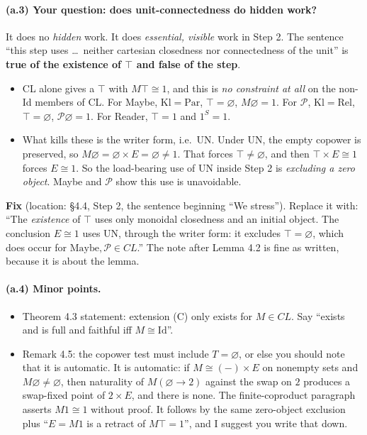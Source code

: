 \documentclass[11pt]{article}
\newcommand{\Kl}{\mathrm{Kl}}
\begin{document}
\paragraph{(a.3) Your question: does unit-connectedness do hidden work?} It does no \emph{hidden} work. It
does \emph{essential, visible} work in Step 2. The sentence ``this step uses \dots\ neither cartesian
closedness nor connectedness of the unit'' is \textbf{true of the existence of $\top$ and false of the step}.
\begin{itemize}
\item CL alone gives a $\top$ with $M\top\cong1$, and this is \emph{no constraint at all} on the non-Id members of
  CL. For Maybe, $\Kl=\mathrm{Par}$, $\top=\varnothing$, $M\varnothing=1$. For $\mathcal P$, $\Kl=\mathrm{Rel}$,
  $\top=\varnothing$, $\mathcal P\varnothing=1$. For Reader, $\top=1$ and $1^S=1$.
\item What kills these is the writer form, i.e.\ UN. Under UN, the empty copower is preserved, so
  $M\varnothing=\varnothing\times E=\varnothing\ne1$. That forces $\top\ne\varnothing$, and then $\top\times E\cong1$ forces
  $E\cong1$. So the load-bearing use of UN inside Step 2 is \emph{excluding a zero object}. Maybe and $\mathcal P$
  show this use is unavoidable.
\end{itemize}
\textbf{Fix} (location: \S4.4, Step 2, the sentence beginning ``We stress''). Replace it with: ``The
\emph{existence} of $\top$ uses only monoidal closedness and an initial object. The conclusion $E\cong1$ uses UN,
through the writer form: it excludes $\top=\varnothing$, which does occur for $\mathrm{Maybe},\mathcal P\in CL$.''
The note after Lemma 4.2 is fine as written, because it is about the lemma.

\paragraph{(a.4) Minor points.}
\begin{itemize}
\item Theorem 4.3 statement: extension (C) only exists for $M\in CL$. Say ``exists and is full and faithful iff
  $M\cong\mathrm{Id}$''.
\item Remark 4.5: the copower test must include $T=\varnothing$, or else you should note that it is automatic. It is
  automatic: if $M\cong(-)\times E$ on nonempty sets and $M\varnothing\neq\varnothing$, then naturality of
  $M(\varnothing\to2)$ against the swap on $2$ produces a swap-fixed point of $2\times E$, and there is none. The
  finite-coproduct paragraph asserts $M1\cong1$ without proof. It follows by the same zero-object exclusion plus
  ``$E=M1$ is a retract of $M\top=1$'', and I suggest you write that down.
\end{itemize}
\end{document}
